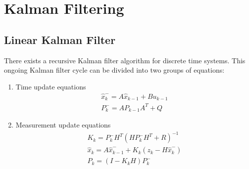 
\section{Kalman Filtering}

\subsection{Linear Kalman Filter}
There exists a recursive Kalman filter algorithm for discrete time systems.\cite{IntroKF} This ongoing Kalman filter cycle can be divided into two groups of equations: \newline
\begin{enumerate}
	\item Time update equations
	\begin{equation}\label{TupEq}
		\begin{aligned}
    			\hat{x}_{k}^{-}=A\hat{x}_{k-1}+Bu_{k-1} \\
    			P_{k}^{-}=AP_{k-1}A^{T}+Q
  		\end{aligned}
	\end{equation}
	\item Measurement update equations
	\begin{equation}\label{MupEq}
		\begin{aligned}
    			K_{k}=P_{k}^{-}H^{T}(HP_{k}^{-}H^{T}+R)^{-1} \\
    			\hat{x}_{k}=A\hat{x}_{k-1}^{-}+K_{k}(z_{k}-H\hat{x}_{k}^{-}) \\
			P_{k}=(I-K_{k}H)P_{k}^{-}
  		\end{aligned}
	\end{equation}
\end{enumerate}

